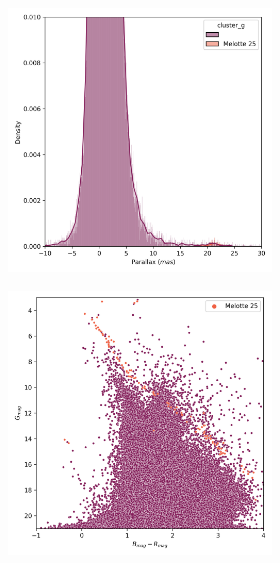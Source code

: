 \documentclass[11pt, a4paper, english]{book}
\begin{document}
\begin{figure}[H]
\begin{subfigure}{0.9\textwidth}
\begin{subfigure}[t]{0.30\textwidth}
      \includegraphics[width=\textwidth]{../figures/melotte_25/parallax_melotte_25.png}
    \end{subfigure}
    \hfill
    \begin{subfigure}[t]{0.30\textwidth}
      \centering
      \includegraphics[width=\textwidth]{../figures/melotte_25/hr_diagram_melotte_25.png}

\end{subfigure}
\end{subfigure}
\end{figure}
\end{document}
